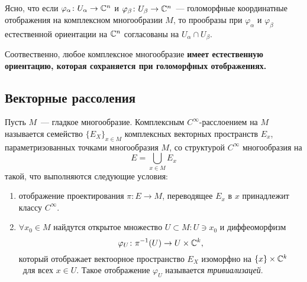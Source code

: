     Ясно, что если $\varphi_{\alpha}\colon U_{\alpha} \to \mathbb{C}^n$ и $\varphi_{\beta}\colon U_{\beta} \to \mathbb{C}^n$~--- голоморфные координатные отображения на
    комплексном многообразии $M$, то прообразы при $\varphi_{\alpha}$ и $\varphi_{\beta}$
    естественной ориентации на  $\mathbb{C}^n$ согласованы на $U_{\alpha} \cap U_{\beta}$.

    Соотвественно, любое комплексное многообразие \bf{имеет естественную ориентацию}, которая сохраняется
    при голоморфных отображениях.

    \subsection{Векторные рассоления}

    \begin{definition} 
        Пусть $M$~--- гладкое многообразие. Комплексным $C^{\infty}$-расслоением на $M$
    называется семейство $\{ E_{X} \}_{x \in M}$ комплексных векторных пространств $E_{x}$, параметризованных точками многообразия $M$,
    со структурой $C^{\infty}$ многообразия на 
    \[
        E = \bigcup_{x \in M} E_{x}
    \]
    такой, что выполняются следующие условия: 
    \begin{enumerate}
        \item отображение проектирования $\pi\colon E \to M$, переводящее $E_x$ в $x$ принадлежит классу $C^{\infty}$.
        \item $\forall x_0 \in M$ найдутся открытое множество $U \subset M\colon U \ni x_0$  и диффеоморфизм 
        \[
            \varphi_{U}\colon \pi^{-1}(U) \to U \times \mathbb{C}^k,
        \]
        который отображает вектоорное пространство $E_X$ изоморфно на $\{ x \} \times \mathbb{C}^k$  для всех $x \in U$.
        Такое отображение $\varphi_{U}$ называется \emph{тривиализацей}. 
    \end{enumerate}
    
    \end{definition}
    